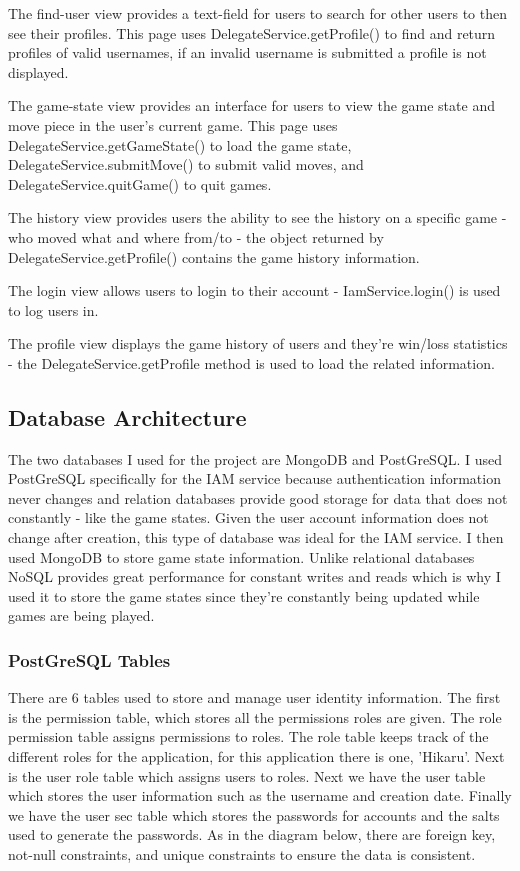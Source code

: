 \documentclass[12pt]{article}
\begin{document}
The find-user view provides a text-field for users to search for other users to then see their profiles. This page uses DelegateService.getProfile() 
to find and return profiles of valid usernames, if an invalid username is submitted a profile is not displayed.

The game-state view provides an interface for users to view the game state and move piece in the user's current game. This page 
uses DelegateService.getGameState() to load the game state, DelegateService.submitMove() to submit valid moves, and DelegateService.quitGame() 
to quit games.

The history view provides users the ability to see the history on a specific game - who moved what and where from/to - 
the object returned by DelegateService.getProfile() contains the game history information.

The login view allows users to login to their account - IamService.login() is used to log users in.

The profile view displays the game history of users and they're win/loss statistics - the DelegateService.getProfile method 
is used to load the related information.

\subsection{Database Architecture}
The two databases I used for the project are MongoDB and PostGreSQL. I used PostGreSQL specifically for the IAM service 
because authentication information never changes and relation databases provide good storage for data that does not constantly 
- like the game states. Given the user account information does not change after creation, this type of database was ideal for 
the IAM service. I then used MongoDB to store game state information. Unlike relational databases NoSQL provides great 
performance for constant writes and reads which is why I used it to store the game states since they're constantly being updated 
while games are being played.


\subsubsection{PostGreSQL Tables}
There are 6 tables used to store and manage user identity information. The first is the permission table, which stores all 
the permissions roles are given. The role permission table assigns permissions to roles. The role table keeps track of the different 
roles for the application, for this application there is one, 'Hikaru'. Next is the user role table which assigns users to roles. 
Next we have the  user table which stores the user information such as the username and creation date. Finally we have the user sec 
table which stores the passwords for accounts and the salts used to generate the passwords. As in the diagram below, there are 
foreign key, not-null constraints, and unique constraints to ensure the data is consistent.
\end{document}

